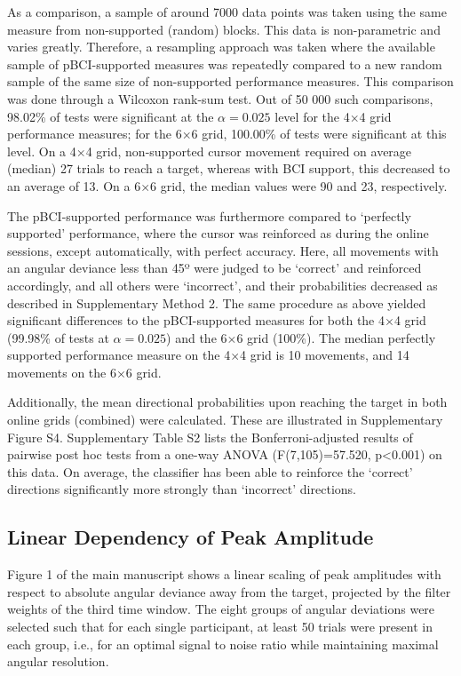 As a comparison, a sample of around 7000 data points was taken using the same measure from non-supported (random) blocks. This data is non-parametric and varies greatly. Therefore, a resampling approach was taken where the available sample of pBCI-supported measures was repeatedly compared to a new random sample of the same size of non-supported performance measures. This comparison was done through a Wilcoxon rank-sum test. Out of 50 000 such comparisons, 98.02\% of tests were significant at the $\alpha=0.025$ level for the 4$\times$4 grid performance measures; for the 6$\times$6 grid, 100.00\% of tests were significant at this level. On a 4$\times$4 grid, non-supported cursor movement required on average (median) 27 trials to reach a target, whereas with BCI support, this decreased to an average of 13. On a 6$\times$6 grid, the median values were 90 and 23, respectively. 

The pBCI-supported performance was furthermore compared to `perfectly supported' performance, where the cursor was reinforced as during the online sessions, except automatically, with perfect accuracy. Here, all movements with an angular deviance less than 45º were judged to be `correct' and reinforced accordingly, and all others were `incorrect', and their probabilities decreased as described in Supplementary Method 2. The same procedure as above yielded significant differences to the pBCI-supported measures for both the 4$\times$4 grid (99.98\% of tests at $\alpha=0.025$) and the 6$\times$6 grid (100\%). The median perfectly supported performance measure on the 4$\times$4 grid is 10 movements, and 14 movements on the 6$\times$6 grid.

Additionally, the mean directional probabilities upon reaching the target in both online grids (combined) were calculated. These are illustrated in Supplementary Figure S4. Supplementary Table S2 lists the Bonferroni-adjusted results of pairwise post hoc tests from a one-way ANOVA (F(7,105)=57.520, p<0.001) on this data. On average, the classifier has been able to reinforce the `correct' directions significantly more strongly than `incorrect' directions.



\subsection*{Linear Dependency of Peak Amplitude}
Figure 1 of the main manuscript shows a linear scaling of peak amplitudes with respect to absolute angular deviance away from the target, projected by the filter weights of the third time window. The eight groups of angular deviations were selected such that for each single participant, at least 50 trials were present in each group, i.e., for an optimal signal to noise ratio while maintaining maximal angular resolution. 

